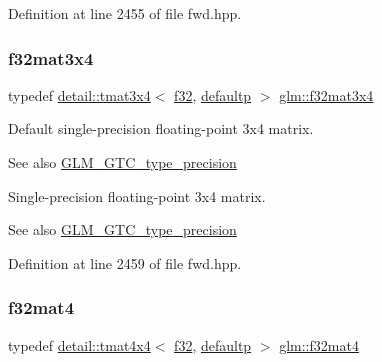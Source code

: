Definition at line 2455 of file fwd.\+hpp.

\mbox{\label{group__gtc__type__precision_ga9d953c44b7bf260d2f2e61d73dc2ab08}} 
\subsubsection{\texorpdfstring{f32mat3x4}{f32mat3x4}}
{\footnotesize\ttfamily typedef \hyperlink{structglm_1_1detail_1_1tmat3x4}{detail\+::tmat3x4}$<$ \hyperlink{group__gtc__type__precision_ga0ec999b57f5330d9021256e96038df04}{f32}, \hyperlink{namespaceglm_a0f04f086094c747d227af4425893f545a9d21ccd8b5a009ec7eb7677befc3bf51}{defaultp} $>$ \hyperlink{group__gtc__type__precision_ga9d953c44b7bf260d2f2e61d73dc2ab08}{glm\+::f32mat3x4}}

Default single-\/precision floating-\/point 3x4 matrix. \begin{DoxySeeAlso}{See also}
\hyperlink{group__gtc__type__precision}{G\+L\+M\+\_\+\+G\+T\+C\+\_\+type\+\_\+precision}
\end{DoxySeeAlso}
Single-\/precision floating-\/point 3x4 matrix. \begin{DoxySeeAlso}{See also}
\hyperlink{group__gtc__type__precision}{G\+L\+M\+\_\+\+G\+T\+C\+\_\+type\+\_\+precision} 
\end{DoxySeeAlso}


Definition at line 2459 of file fwd.\+hpp.

\mbox{\label{group__gtc__type__precision_ga6bf98d2ab0eb4889e5190c26e1853292}} 
\subsubsection{\texorpdfstring{f32mat4}{f32mat4}}
{\footnotesize\ttfamily typedef \hyperlink{structglm_1_1detail_1_1tmat4x4}{detail\+::tmat4x4}$<$ \hyperlink{group__gtc__type__precision_ga0ec999b57f5330d9021256e96038df04}{f32}, \hyperlink{namespaceglm_a0f04f086094c747d227af4425893f545a9d21ccd8b5a009ec7eb7677befc3bf51}{defaultp} $>$ \hyperlink{group__gtc__type__precision_ga6bf98d2ab0eb4889e5190c26e1853292}{glm\+::f32mat4}}


